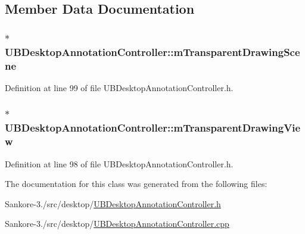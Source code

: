 \subsection{Member Data Documentation}
\hypertarget{class_u_b_desktop_annotation_controller_a58e3a85e54ed2c75e41eb2475300283d}{
\subsubsection[{m\-Transparent\-Drawing\-Scene}]{$\ast$ U\-B\-Desktop\-Annotation\-Controller\-::m\-Transparent\-Drawing\-Scene\hspace{0.3cm}{\ttfamily [protected]}}}\label{d7/db7/class_u_b_desktop_annotation_controller_a58e3a85e54ed2c75e41eb2475300283d}


Definition at line 99 of file U\-B\-Desktop\-Annotation\-Controller.\-h.

\hypertarget{class_u_b_desktop_annotation_controller_a11d2fda8abe318d8a9e10f0fc41c4614}{
\subsubsection[{m\-Transparent\-Drawing\-View}]{$\ast$ U\-B\-Desktop\-Annotation\-Controller\-::m\-Transparent\-Drawing\-View\hspace{0.3cm}{\ttfamily [protected]}}}\label{d7/db7/class_u_b_desktop_annotation_controller_a11d2fda8abe318d8a9e10f0fc41c4614}


Definition at line 98 of file U\-B\-Desktop\-Annotation\-Controller.\-h.



The documentation for this class was generated from the following files\-:\begin{DoxyCompactItemize}
\item 
Sankore-\/3./src/desktop/\hyperlink{_u_b_desktop_annotation_controller_8h}{U\-B\-Desktop\-Annotation\-Controller.\-h}\item 
Sankore-\/3./src/desktop/\hyperlink{_u_b_desktop_annotation_controller_8cpp}{U\-B\-Desktop\-Annotation\-Controller.\-cpp}\end{DoxyCompactItemize}
